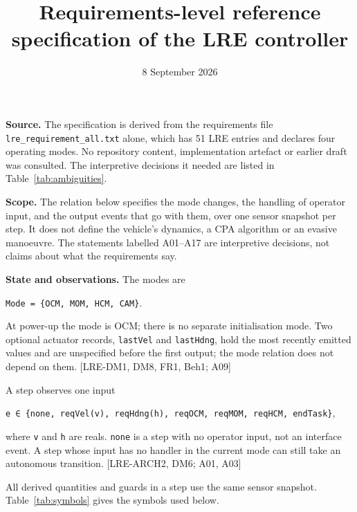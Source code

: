 \documentclass[
  10pt,
]{article}
\title{Requirements-level reference specification of the LRE controller}
\author{}
\date{8 September 2026}
\newcounter{none} %
\begin{document}
\maketitle

\textbf{Source.} The specification is derived from the requirements file
\texttt{lre\_requirement\_all.txt} alone, which has 51 LRE entries and
declares four operating modes. No repository content, implementation
artefact or earlier draft was consulted. The interpretive decisions it
needed are listed in Table~\ref{tab:ambiguities}.

\textbf{Scope.} The relation below specifies the mode changes, the
handling of operator input, and the output events that go with them,
over one sensor snapshot per step. It does not define the vehicle's
dynamics, a CPA algorithm or an evasive manoeuvre. The statements
labelled A01--A17 are interpretive decisions, not claims about what the
requirements say.

\textbf{State and observations.} The modes are

\texttt{Mode\ =\ \{OCM,\ MOM,\ HCM,\ CAM\}}.

At power-up the mode is OCM; there is no separate initialisation mode.
Two optional actuator records, \texttt{lastVel} and \texttt{lastHdng},
hold the most recently emitted values and are unspecified before the
first output; the mode relation does not depend on them. {[}LRE-DM1,
DM8, FR1, Beh1; A09{]}

A step observes one input

\texttt{e\ ∈\ \{none,\ reqVel(v),\ reqHdng(h),\ reqOCM,\ reqMOM,\ reqHCM,\ endTask\}},

where \texttt{v} and \texttt{h} are reals. \texttt{none} is a step with
no operator input, not an interface event. A step whose input has no
handler in the current mode can still take an autonomous transition.
{[}LRE-ARCH2, DM6; A01, A03{]}

All derived quantities and guards in a step use the same sensor
snapshot. Table~\ref{tab:symbols} gives the symbols used below.
\end{document}
